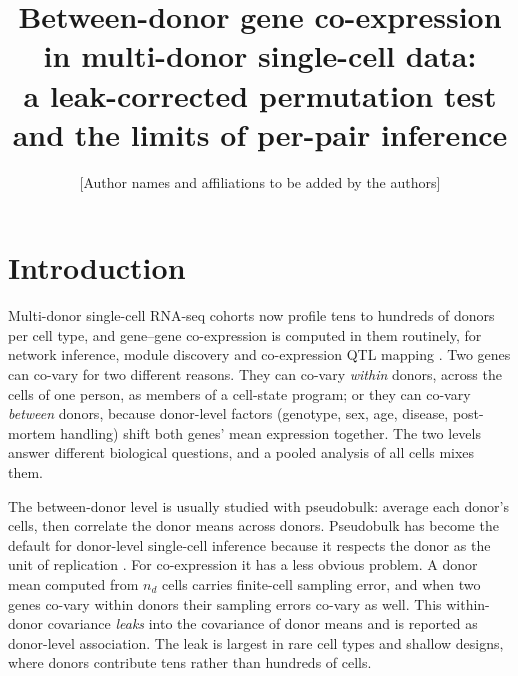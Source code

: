 \documentclass[10pt,letterpaper]{article}
\title{Between-donor gene co-expression in multi-donor single-cell data:\\ a leak-corrected permutation test and the limits of per-pair inference}
\author{[Author names and affiliations to be added by the authors]}
\date{}
\theoremstyle{definition}
\begin{document}
\maketitle

\begin{abstract}

\end{abstract}

\section{Introduction}

Multi-donor single-cell RNA-seq cohorts now profile tens to hundreds of donors per cell type, and gene--gene co-expression is computed in them routinely, for network inference, module discovery and co-expression QTL mapping \citep{Li2023coeQTL}. Two genes can co-vary for two different reasons. They can co-vary \emph{within} donors, across the cells of one person, as members of a cell-state program; or they can co-vary \emph{between} donors, because donor-level factors (genotype, sex, age, disease, post-mortem handling) shift both genes' mean expression together. The two levels answer different biological questions, and a pooled analysis of all cells mixes them.

The between-donor level is usually studied with pseudobulk: average each donor's cells, then correlate the donor means across donors. Pseudobulk has become the default for donor-level single-cell inference because it respects the donor as the unit of replication \citep{Squair2021,Zimmerman2021}. For co-expression it has a less obvious problem. A donor mean computed from $n_d$ cells carries finite-cell sampling error, and when two genes co-vary within donors their sampling errors co-vary as well. This within-donor covariance \emph{leaks} into the covariance of donor means and is reported as donor-level association. The leak is largest in rare cell types and shallow designs, where donors contribute tens rather than hundreds of cells.
\end{document}
